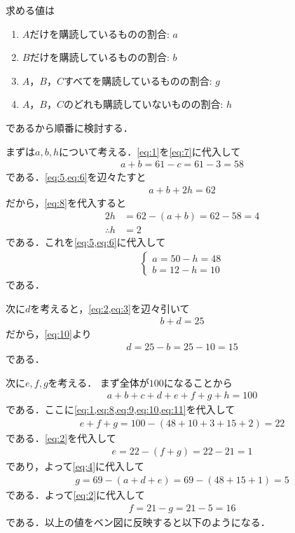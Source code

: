\documentclass[../../main.tex]{subfiles}
\begin{document}
求める値は
\begin{enumerate}
  \item $A$だけを購読しているものの割合: $a$
  \item $B$だけを購読しているものの割合: $b$
  \item $A$，$B$，$C$すべてを購読しているものの割合: $g$
  \item $A$，$B$，$C$のどれも購読していないものの割合: $h$
\end{enumerate}
であるから順番に検討する．

まずは$a,b,h$について考える．\cref{eq:1}を\cref{eq:7}に代入して
\begin{align}
  a+b = 61-c = 61-3 = 58 \label{eq:8}
\end{align}
である．\cref{eq:5,eq:6}を辺々たすと
\begin{align}
  a+b+2h=62
\end{align}
だから，\cref{eq:8}を代入すると
\begin{align}
  2h &= 62 - (a+b) = 62 - 58 = 4 \\
  \therefore
  h &= 2 \label{eq:9}
\end{align}
である．これを\cref{eq:5,eq:6}に代入して
\begin{align}
  \begin{cases}
    a = 50 - h = 48 \\
    b = 12 - h = 10
  \end{cases} \label{eq:10}
\end{align}
である．

次に$d$を考えると，\cref{eq:2,eq:3}を辺々引いて
\begin{align}
  b+d=25
\end{align}
だから，\cref{eq:10}より
\begin{align}
  d = 25 - b = 25 - 10 = 15 \label{eq:11}
\end{align}
である．

次に$e,f,g$を考える．
まず全体が$100$になることから
\begin{align}
  a+b+c+d+e+f+g+h=100 \label{eq:12}
\end{align}
である．ここに\cref{eq:1,eq:8,eq:9,eq:10,eq:11}を代入して
\begin{align}
  e+f+g = 100 - (48+10+3+15+2) = 22 \label{eq:13}
\end{align}
である．\cref{eq:2}を代入して
\begin{align}
  e = 22 - (f+g) = 22 - 21 = 1 \label{eq:14}
\end{align}
であり，よって\cref{eq:4}に代入して
\begin{align}
  g = 69 - (a+d+e) = 69 - (48+15+1) = 5 \label{eq:15}
\end{align}
である．よって\cref{eq:2}に代入して
\begin{align}
  f = 21 - g = 21 - 5 = 16 \label{eq:16}
\end{align}
である．以上の値をベン図に反映すると以下のようになる．
\end{document}
